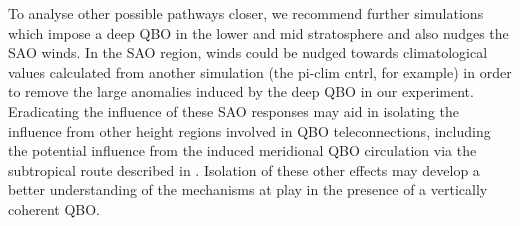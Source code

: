 To analyse other possible pathways closer, we recommend further simulations which impose a deep QBO in the lower and mid stratosphere and also nudges the SAO winds. In the SAO region, winds could be nudged towards climatological values calculated from another simulation (the pi-clim cntrl, for example) in order to remove the large anomalies induced by the deep QBO in our experiment. Eradicating the influence of these SAO responses may aid in isolating the influence from other height regions involved in QBO teleconnections, including the potential influence from the induced meridional QBO circulation via the subtropical route described in \cite{graySurface2018b}. Isolation of these other effects may develop a better understanding of the mechanisms at play in the presence of a vertically coherent QBO.  
















